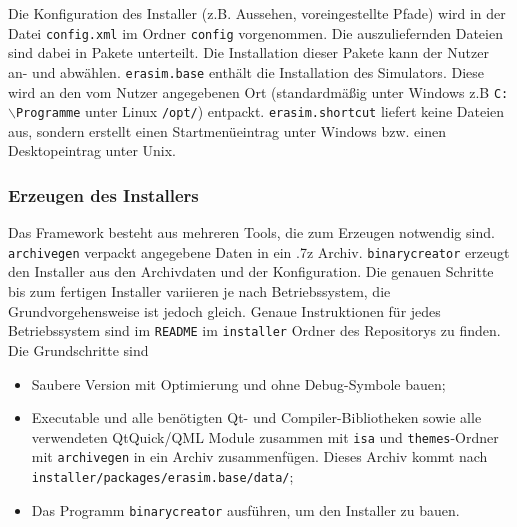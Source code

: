 Die Konfiguration des Installer (z.B. Aussehen, voreingestellte Pfade) wird in
der Datei \texttt{config.xml} im Ordner \texttt{config} vorgenommen. Die
auszuliefernden Dateien sind dabei in Pakete unterteilt. Die Installation dieser
Pakete kann der Nutzer an- und abwählen. \texttt{erasim.base} enthält die
Installation des Simulators. Diese wird an den vom Nutzer angegebenen Ort
(standardmäßig unter Windows z.B \texttt{C:$\backslash$Programme} unter Linux
\texttt{/opt/}) entpackt. \texttt{erasim.shortcut} liefert keine Dateien aus,
sondern erstellt einen Startmenüeintrag unter Windows bzw. einen Desktopeintrag
unter Unix.

\subsubsection{Erzeugen des Installers}

Das Framework besteht aus mehreren Tools, die zum Erzeugen notwendig sind.
\texttt{archivegen} verpackt angegebene Daten in ein .7z Archiv.
\texttt{binarycreator} erzeugt den Installer aus den Archivdaten und der
Konfiguration. Die genauen Schritte bis zum fertigen Installer variieren je nach
Betriebssystem, die Grundvorgehensweise ist jedoch gleich. Genaue Instruktionen
für jedes Betriebssystem sind im \texttt{README} im \texttt{installer} Ordner
des Repositorys zu finden. Die Grundschritte sind
\begin{itemize}
	\item Saubere Version mit Optimierung und ohne Debug-Symbole bauen;

	\item Executable und alle benötigten Qt- und Compiler-Bibliotheken sowie alle
	verwendeten QtQuick/QML Module zusammen mit \texttt{isa} und
	\texttt{themes}-Ordner mit \texttt{archivegen} in ein Archiv zusammenfügen.
	Dieses Archiv kommt nach \texttt{installer/packages/erasim.base/data/};

	\item Das Programm \texttt{binarycreator} ausführen, um den Installer zu
	bauen.

\end{itemize}
